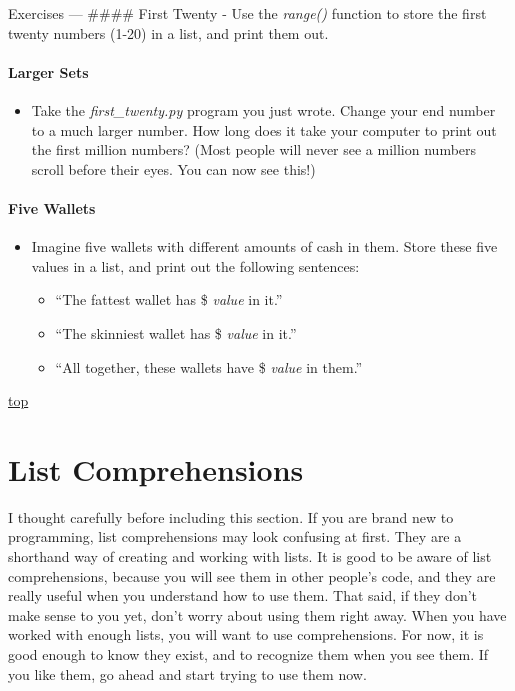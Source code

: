 \documentclass[11pt]{article}
\providecommand{\tightlist}{%
      \setlength{\itemsep}{0pt}\setlength{\parskip}{0pt}}
\begin{document}
    Exercises --- \#\#\#\# First Twenty - Use the \emph{range()} function to
store the first twenty numbers (1-20) in a list, and print them out.

\hypertarget{larger-sets}{%
\paragraph{Larger Sets}\label{larger-sets}}

\begin{itemize}
\tightlist
\item
  Take the \emph{first\_twenty.py} program you just wrote. Change your
  end number to a much larger number. How long does it take your
  computer to print out the first million numbers? (Most people will
  never see a million numbers scroll before their eyes. You can now see
  this!)
\end{itemize}

\hypertarget{five-wallets}{%
\paragraph{Five Wallets}\label{five-wallets}}

\begin{itemize}
\tightlist
\item
  Imagine five wallets with different amounts of cash in them. Store
  these five values in a list, and print out the following sentences:

  \begin{itemize}
  \tightlist
  \item
    ``The fattest wallet has \$ \emph{value} in it.''
  \item
    ``The skinniest wallet has \$ \emph{value} in it.''
  \item
    ``All together, these wallets have \$ \emph{value} in them.''
  \end{itemize}
\end{itemize}

    \protect\hyperlink{}{top}

    \hypertarget{list-comprehensions}{%
\section{List Comprehensions}\label{list-comprehensions}}

I thought carefully before including this section. If you are brand new
to programming, list comprehensions may look confusing at first. They
are a shorthand way of creating and working with lists. It is good to be
aware of list comprehensions, because you will see them in other
people's code, and they are really useful when you understand how to use
them. That said, if they don't make sense to you yet, don't worry about
using them right away. When you have worked with enough lists, you will
want to use comprehensions. For now, it is good enough to know they
exist, and to recognize them when you see them. If you like them, go
ahead and start trying to use them now.
\end{document}
